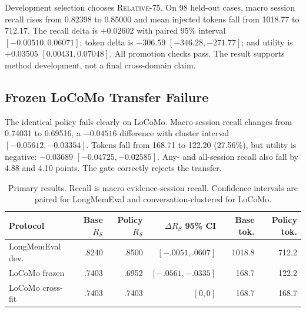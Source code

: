 \documentclass[10pt]{article}
\newcommand{\rel}{\textsc{Relative-75}\xspace}
\begin{document}
Development selection chooses \rel. On 98 held-out cases, macro session recall
rises from 0.82398 to 0.85000 and mean injected tokens fall from 1018.77 to
712.17. The recall delta is $+0.02602$ with paired 95\% interval
$[-0.00510,0.06071]$; token delta is $-306.59$
$[-346.28,-271.77]$; and utility is $+0.03505$
$[0.00431,0.07048]$. All promotion checks pass. The result supports method
development, not a final cross-domain claim.

\subsection{Frozen LoCoMo Transfer Failure}

The identical policy fails clearly on LoCoMo. Macro session recall changes from
0.74031 to 0.69516, a $-0.04516$ difference with cluster interval
$[-0.05612,-0.03354]$. Tokens fall from 168.71 to 122.20 (27.56\%), but utility
is negative: $-0.03689$ $[-0.04725,-0.02585]$. Any- and all-session recall also
fall by 4.88 and 4.10 points. The gate correctly rejects the transfer.

\begin{table}[t]
\centering
\small
\caption{Primary results. Recall is macro evidence-session recall. Confidence
intervals are paired for LongMemEval and conversation-clustered for LoCoMo.}
\label{tab:main-results}
\begin{tabular}{@{}lrrrrr@{}}
\toprule
Protocol & Base $R_S$ & Policy $R_S$ & $\Delta R_S$ 95\% CI & Base tok. & Policy tok. \\
\midrule
LongMemEval dev. & .8240 & .8500 & $[-.0051,.0607]$ & 1018.8 & 712.2 \\
LoCoMo frozen & .7403 & .6952 & $[-.0561,-.0335]$ & 168.7 & 122.2 \\
LoCoMo cross-fit & .7403 & .7403 & $[0,0]$ & 168.7 & 168.7 \\
\bottomrule
\end{tabular}
\end{table}
\end{document}
